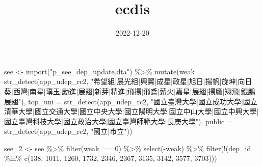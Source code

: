 \documentclass[
]{article}
\title{ecdis}
\author{}
\date{\vspace{-2.5em}2022-12-20}
\newenvironment{Shaded}{\begin{snugshade}}{\end{snugshade}}
\newcommand{\AttributeTok}[1]{\textcolor[rgb]{0.77,0.63,0.00}{#1}}
\newcommand{\DecValTok}[1]{\textcolor[rgb]{0.00,0.00,0.81}{#1}}
\newcommand{\FunctionTok}[1]{\textcolor[rgb]{0.00,0.00,0.00}{#1}}
\newcommand{\NormalTok}[1]{#1}
\newcommand{\OtherTok}[1]{\textcolor[rgb]{0.56,0.35,0.01}{#1}}
\newcommand{\SpecialCharTok}[1]{\textcolor[rgb]{0.00,0.00,0.00}{#1}}
\newcommand{\StringTok}[1]{\textcolor[rgb]{0.31,0.60,0.02}{#1}}
\begin{document}
\maketitle

\begin{Shaded}
\begin{Highlighting}[]
\NormalTok{see }\OtherTok{\textless{}{-}} \FunctionTok{import}\NormalTok{(}\StringTok{"p\_see\_dep\_update.dta"}\NormalTok{) }\SpecialCharTok{\%\textgreater{}\%} 
  \FunctionTok{mutate}\NormalTok{(}\AttributeTok{weak =} \FunctionTok{str\_detect}\NormalTok{(app\_udep\_rc2, }\StringTok{"希望組|晨光組|興翼|成星|政星|旭日|揚帆|旋坤|向日葵|西灣|南星|璞玉|勵進|展翅|新芽|精進|飛揚|飛鳶|薪火|嘉星|展翅|揚鷹|翔飛|鯤鵬展翅"}\NormalTok{),}
         \AttributeTok{top\_uni =} \FunctionTok{str\_detect}\NormalTok{(app\_udep\_rc2, }\StringTok{"國立臺灣大學|國立成功大學|國立清華大學|國立交通大學|國立中央大學|國立陽明大學|國立中山大學|國立中興大學|國立臺灣科技大學|國立政治大學|國立臺灣師範大學|長庚大學"}\NormalTok{),}
         \AttributeTok{public =} \FunctionTok{str\_detect}\NormalTok{(app\_udep\_rc2, }\StringTok{"國立|市立"}\NormalTok{))}

\NormalTok{see\_2 }\OtherTok{\textless{}{-}}\NormalTok{ see }\SpecialCharTok{\%\textgreater{}\%} 
  \FunctionTok{filter}\NormalTok{(weak }\SpecialCharTok{==} \DecValTok{0}\NormalTok{) }\SpecialCharTok{\%\textgreater{}\%}
  \FunctionTok{select}\NormalTok{(}\SpecialCharTok{{-}}\NormalTok{weak) }\SpecialCharTok{\%\textgreater{}\%}
  \FunctionTok{filter}\NormalTok{(}\SpecialCharTok{!}\NormalTok{(dep\_id }\SpecialCharTok{\%in\%} \FunctionTok{c}\NormalTok{(}\DecValTok{138}\NormalTok{, }\DecValTok{1011}\NormalTok{, }\DecValTok{1260}\NormalTok{, }\DecValTok{1732}\NormalTok{, }\DecValTok{2346}\NormalTok{, }\DecValTok{2367}\NormalTok{, }\DecValTok{3135}\NormalTok{, }\DecValTok{3142}\NormalTok{, }\DecValTok{3577}\NormalTok{, }\DecValTok{3703}\NormalTok{)))}
\end{Highlighting}
\end{Shaded}
\end{document}
